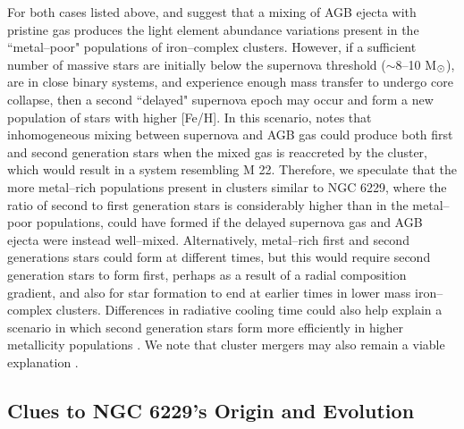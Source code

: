 \documentclass[12pt,preprint]{emulateapj}
\begin{document}
For both cases listed above, \citet{D'Antona16} and \citet{D'Ercole16} suggest
that a mixing of AGB ejecta with pristine gas produces the light element 
abundance variations present in the ``metal--poor" populations of 
iron--complex clusters.  However, if a sufficient number of massive stars are 
initially below the supernova threshold ($\sim$8--10 M$_{\rm \odot}$), are in
close binary systems, and experience enough mass transfer to undergo core 
collapse, then a second ``delayed" supernova epoch may occur and form a new
population of stars with higher [Fe/H].  In this scenario, 
\citet{D'Ercole16} notes that inhomogeneous mixing between supernova and AGB
gas could produce both first and second generation stars when the mixed gas 
is reaccreted by the cluster, which would result in a system resembling M 22.
Therefore, we speculate that the more metal--rich populations present in 
clusters similar to NGC 6229, where the ratio of second to first generation
stars is considerably higher than in the metal--poor populations, could have 
formed if the delayed supernova gas and AGB ejecta were instead well--mixed.
Alternatively, metal--rich first and second generations stars could form at 
different times, but this would require second generation stars to form first, 
perhaps as a result of a radial composition gradient, and also for star 
formation to end at earlier times in lower mass iron--complex clusters.  
Differences in radiative cooling time could also help explain a scenario in 
which second generation stars form more efficiently in higher metallicity 
populations \citep[e.g., ][see their Section 4.2.3]{Herwig12}.  We note that 
cluster mergers may also remain a viable explanation 
\citep[e.g., ][]{Carretta10c,Gavagnin16}.

\subsection{Clues to NGC 6229's Origin and Evolution}
\end{document}
